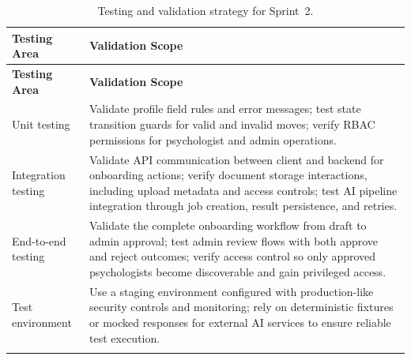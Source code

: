 \documentclass[a4paper,12pt]{report}
\begin{document}
\begin{longtable}{@{} L{0.22\textwidth} L{0.68\textwidth} @{}}
\toprule
\textbf{Testing Area} &
\textbf{Validation Scope} \\
\midrule
\endfirsthead

\toprule
\textbf{Testing Area} &
\textbf{Validation Scope} \\
\midrule
\endhead

Unit testing & Validate profile field rules and error messages; test state transition guards for valid and invalid moves; verify RBAC permissions for psychologist and admin operations. \\
\midrule
Integration testing & Validate API communication between client and backend for onboarding actions; verify document storage interactions, including upload metadata and access controls; test AI pipeline integration through job creation, result persistence, and retries. \\
\midrule
End-to-end testing & Validate the complete onboarding workflow from draft to admin approval; test admin review flows with both approve and reject outcomes; verify access control so only approved psychologists become discoverable and gain privileged access. \\
\midrule
Test environment & Use a staging environment configured with production-like security controls and monitoring; rely on deterministic fixtures or mocked responses for external AI services to ensure reliable test execution. \\
\bottomrule
\caption{Testing and validation strategy for Sprint~2.}
\label{tab:sprint2-testing-strategy}\\
\end{longtable}
\end{document}
